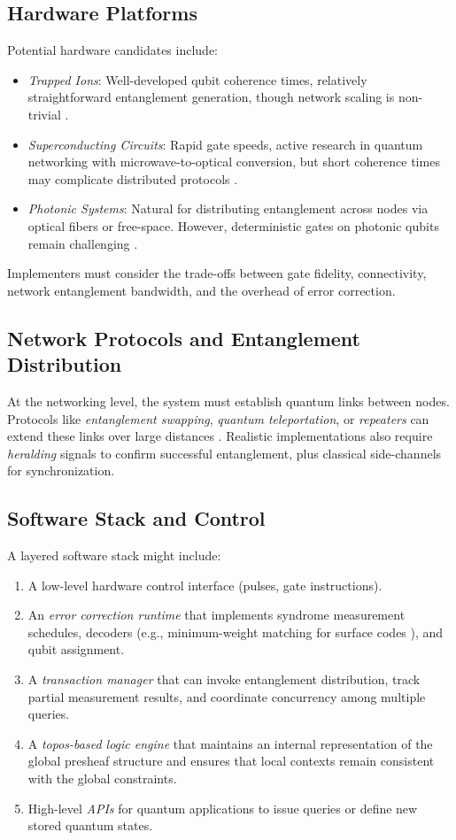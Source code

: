 \documentclass[11pt]{article}
\begin{document}
\subsection{Hardware Platforms}
Potential hardware candidates include:
\begin{itemize}
    \item \emph{Trapped Ions}: Well-developed qubit coherence times, relatively straightforward entanglement generation, though network scaling is non-trivial \cite{blatt_wineland}.
    \item \emph{Superconducting Circuits}: Rapid gate speeds, active research in quantum networking with microwave-to-optical conversion, but short coherence times may complicate distributed protocols \cite{kjaergaard_review}.
    \item \emph{Photonic Systems}: Natural for distributing entanglement across nodes via optical fibers or free-space. However, deterministic gates on photonic qubits remain challenging \cite{kok_photonic}.
\end{itemize}

Implementers must consider the trade-offs between gate fidelity, connectivity, network entanglement bandwidth, and the overhead of error correction.

\subsection{Network Protocols and Entanglement Distribution}
At the networking level, the system must establish quantum links between nodes. Protocols like \emph{entanglement swapping}, \emph{quantum teleportation}, or \emph{repeaters} can extend these links over large distances \cite{briegel_repeater, munro_repeater}. Realistic implementations also require \emph{heralding} signals to confirm successful entanglement, plus classical side-channels for synchronization.

\subsection{Software Stack and Control}
A layered software stack might include:
\begin{enumerate}
    \item A low-level hardware control interface (pulses, gate instructions).
    \item An \emph{error correction runtime} that implements syndrome measurement schedules, decoders (e.g., minimum-weight matching for surface codes \cite{fowler}), and qubit assignment.
    \item A \emph{transaction manager} that can invoke entanglement distribution, track partial measurement results, and coordinate concurrency among multiple queries.
    \item A \emph{topos-based logic engine} that maintains an internal representation of the global presheaf structure and ensures that local contexts remain consistent with the global constraints.
    \item High-level \emph{APIs} for quantum applications to issue queries or define new stored quantum states.
\end{enumerate}
\end{document}
